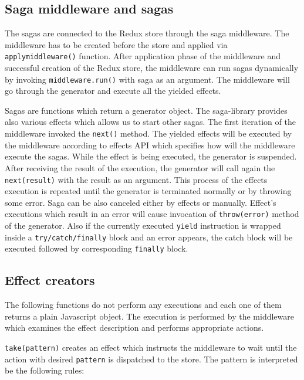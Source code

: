 \subsection{Saga middleware and sagas} \label{helpers}
The sagas are connected to the Redux store through the saga middleware. The middleware has to be created before the store and applied via \texttt{applymiddleware()} function. After application phase of the middleware and successful creation of the Redux store, the middleware can run sagas dynamically by invoking \texttt{middleware.run()} with saga as an argument. The middleware will go through the generator and execute all the yielded effects.

Sagas are functions which return a generator object. The saga-library provides also various effects which allows us to start other sagas. The first iteration of the middleware invoked the \texttt{next()} method. The yielded effects will be executed by the middleware according to effects API which specifies how will the middleware execute the sagas. While the effect is being executed, the generator is suspended. After receiving the result of the execution, the generator will call again the \texttt{next(result)} with the result as an argument. This process of the effects execution is repeated until the generator is terminated normally or by throwing some error. Saga can be also canceled either by effects or manually. Effect's executions which result in an error will cause invocation of \texttt{throw(error)} method of the generator. Also if the currently executed \texttt{yield} instruction is wrapped inside a \texttt{try/catch/finally} block and an error appears, the catch block will be executed followed by corresponding \texttt{finally} block.\cite{redux-saga-api}

\subsection{Effect creators}
The following functions do not perform any executions and each one of them returns a plain Javascript object. The execution is performed by the middleware which examines the effect description and performs appropriate actions.

\texttt{take(pattern)} creates an effect which instructs the middleware to wait until the action with desired \texttt{pattern} is dispatched to the store. The pattern is interpreted be the following rules: 

